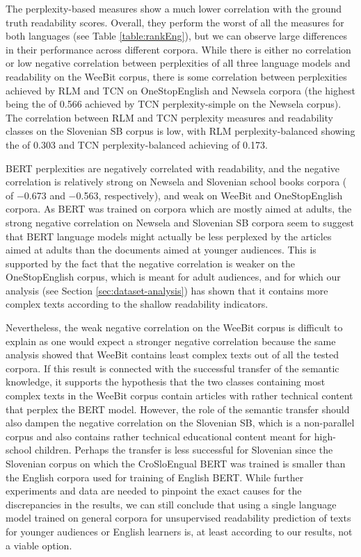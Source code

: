 \documentclass{clv3}
\begin{document}
The perplexity-based measures show a much lower correlation with the ground truth readability scores. Overall, they perform the worst of all the measures for both languages (see Table \ref{table:rankEng}), but we can observe large differences in their performance across different corpora. While there is either no correlation or low negative correlation between perplexities of all three language models and readability on the WeeBit corpus, there is some correlation between perplexities achieved by RLM and TCN on OneStopEnglish and Newsela corpora (the highest being the  of 0.566 achieved by TCN perplexity-simple on the Newsela corpus). The correlation between RLM and TCN perplexity measures and readability classes on the Slovenian SB corpus is low, with RLM perplexity-balanced showing the  of 0.303 and TCN perplexity-balanced achieving  of 0.173.  

BERT perplexities are negatively correlated with readability, and the negative correlation is relatively strong on Newsela and Slovenian school books corpora ( of \num{-0.673} and \num{-0.563}, respectively), and weak on WeeBit and OneStopEnglish corpora. As BERT was trained on corpora which are mostly aimed at adults, the strong negative correlation on Newsela and Slovenian SB corpora seem to suggest that BERT language models might actually be less perplexed by the articles aimed at adults than the documents aimed at younger audiences. This is supported by the fact that the negative correlation is weaker on the OneStopEnglish corpus, which is meant for adult audiences, and for which our analysis (see Section \ref{sec:dataset-analysis}) has shown that it contains more complex texts according to the shallow readability indicators. 

Nevertheless, the weak negative correlation on the WeeBit corpus is difficult to explain as one would expect a stronger negative correlation because the same analysis showed that WeeBit contains least complex texts out of all the tested corpora. If this result is connected with the successful transfer of the semantic knowledge, it supports the hypothesis that the two classes containing most complex texts in the WeeBit corpus contain articles with rather technical content that perplex the BERT model. However, the role of the semantic transfer should also dampen the negative correlation on the Slovenian SB, which is a non-parallel corpus and also contains rather technical educational content meant for high-school children. Perhaps the transfer is less successful for Slovenian since the Slovenian corpus on which the CroSloEngual BERT was trained is smaller than the English corpora used for training of English BERT. While further experiments and data are needed to pinpoint the exact causes for the discrepancies in the results, we can still conclude that using a single language model trained on general corpora for unsupervised readability prediction of texts for younger audiences or English learners is, at least according to our results, not a viable option.
\end{document}

